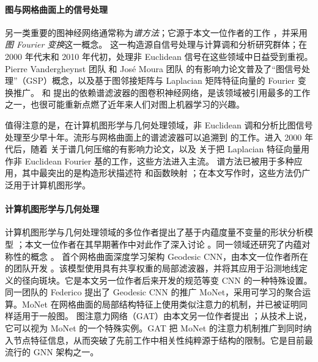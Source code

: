 





\paragraph{图与网格曲面上的信号处理}
另一类重要的图神经网络通常称为\emph{谱方法}；它源于本文一位作者的工作 \citep{bruna2013spectral}，并采用\emph{图 Fourier 变换}这一概念。
%
这一构造源自信号处理与计算调和分析研究群体；在 2000 年代末和 2010 年代初，处理非 Euclidean 信号在这些领域中日益受到重视。Pierre Vandergheynst 团队 \citep{shuman2013emerging} 和 Jos{\'e} Moura 团队 \citep{sandryhaila2013discrete} 的有影响力论文普及了“图信号处理”（GSP）概念，以及基于图邻接矩阵与 Laplacian 矩阵特征向量的 Fourier 变换推广。
%
\citet{defferrard2016convolutional} 和 \cite{kipf2016semi} 提出的依赖谱滤波器的图卷积神经网络，是该领域被引用最多的工作之一，也很可能重新点燃了近年来人们对图上机器学习的兴趣。


值得注意的是，在计算机图形学与几何处理领域，非 Euclidean 调和分析比图信号处理至少早十年。流形与网格曲面上的谱滤波器可以追溯到 \cite{taubin1996optimal} 的工作。进入 2000 年代后，随着%
\cite{karni2000spectral} 关于谱几何压缩的有影响力论文，以及 \cite{levy2006laplace} 关于把 Laplacian 特征向量用作非 Euclidean Fourier 基的工作，这些方法进入主流。
%
谱方法已被用于多种应用，其中最突出的是构造形状描述符 \citep{sun2009concise} 和函数映射 \citep{ovsjanikov2012functional}；在本文写作时，这些方法仍广泛用于计算机图形学。






\paragraph{计算机图形学与几何处理}
计算机图形学与几何处理领域的多位作者提出了基于内蕴度量不变量的形状分析模型 \citep{elad2003bending,memoli2005theoretical,bronstein2006generalized}；本文一位作者在其早期著作中对此作了深入讨论 \citep{bronstein2008numerical}。同一领域还研究了内蕴对称性的概念 \cite{raviv2007symmetries,ovsjanikov2008global}。
%
首个网格曲面深度学习架构 Geodesic CNN，由本文一位作者所在的团队开发 \citep{masci2015geodesic}。该模型使用具有共享权重的局部滤波器，并将其应用于沿测地线定义的径向斑块。它是本文另一位作者后来开发的规范等变 CNN \citep{cohen2019gauge} 的一种特殊设置。
%
同一团队的 Federico \cite{monti2017geometric} 提出了 Geodesic CNN 的推广 MoNet，采用可学习的聚合运算。MoNet 在网格曲面的局部结构特征上使用类似注意力的机制，并已被证明同样适用于一般图。
%
图注意力网络（GAT）由本文另一位作者提出 \citep{velickovic2018graph}；从技术上说，它可以视为 MoNet 的一个特殊实例。GAT 把 MoNet 的注意力机制推广到同时纳入节点特征信息，从而突破了先前工作中相关性纯粹源于结构的限制。它是目前最流行的 GNN 架构之一。


